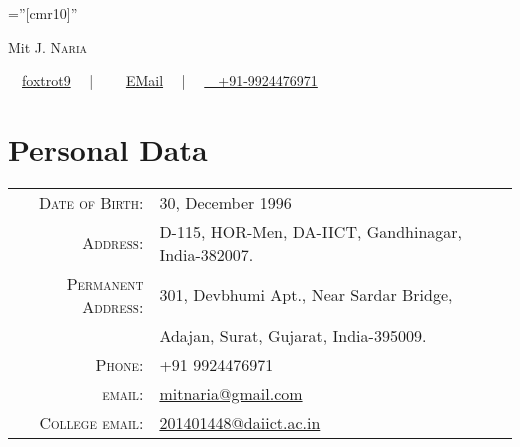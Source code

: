 \documentclass[a4paper,10pt]{article}
\begin{document}
\font\fb=''[cmr10]'' %



\par{\centering
		{\Huge Mit \textsc{J. Naria}
		}
		\bigskip\par}

\begin{center}
		\faGithub \ \ \href{https://github.com/foxtrot9/}{foxtrot9} \ \
		| \ \ \faEnvelope \ \ \href{mailto:mitnaria@gmail.com}{EMail} \ \
		| \ \ \href{}{\faPhone \ \ +91-9924476971} \ \
\end{center}

\section{Personal Data}

\begin{tabular}{rl}
    \textsc{Date of Birth:} & 30, December 1996 \\
    \textsc{Address:}   & D-115, HOR-Men, DA-IICT, Gandhinagar, India-382007. \\
    \textsc{Permanent Address:} & 301, Devbhumi Apt., Near Sardar Bridge, \\
    & Adajan, Surat, Gujarat, India-395009. \\
    \textsc{Phone:}     & +91 9924476971\\
    \textsc{email:}     & \href{mailto:mitnaria@gmail.com}{mitnaria@gmail.com} \\
    \textsc{College email:} & \href{mailto:201401448@daiict.ac.in}{201401448@daiict.ac.in} \\
\end{tabular}

\end{document}

